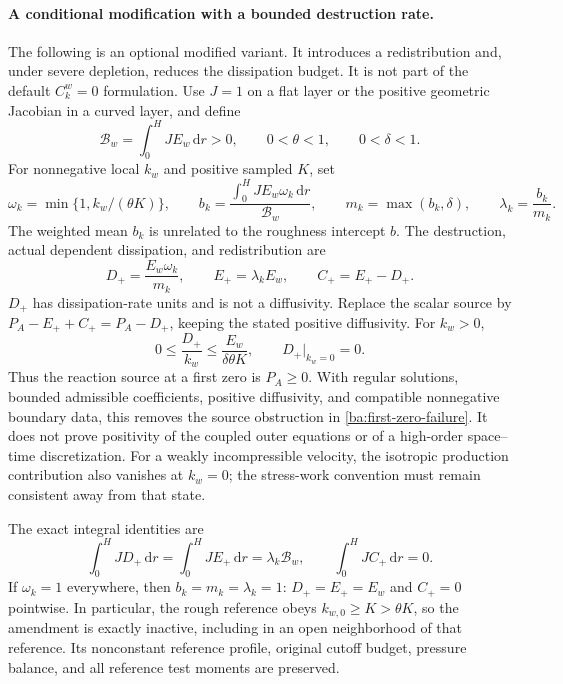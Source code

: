 \documentclass[11pt,a4paper]{article}
\numberwithin{equation}{section}
\begin{document}
\paragraph{A conditional modification with a bounded destruction rate.}
The following is an optional modified variant. It introduces a
redistribution and, under severe depletion, reduces the dissipation
budget. It is not part of the default $C_k^w=0$ formulation.
Use $J=1$ on a flat layer or the positive geometric Jacobian in a curved
layer, and define
\begin{equation}
 \mathcal B_w=\int_0^H J E_w\,\mathrm dr>0,\qquad
 0<\theta<1,\qquad 0<\delta<1.
 \label{ba:positive-budget}
\end{equation}
For nonnegative local $k_w$ and positive sampled $K$, set
\begin{equation}
 \omega_k=\min\{1,k_w/(\theta K)\},\qquad
 b_k=\frac{\int_0^H J E_w\omega_k\,\mathrm dr}{\mathcal B_w},
 \qquad m_k=\max(b_k,\delta),\qquad \lambda_k=\frac{b_k}{m_k}.
 \label{ba:positive-weights}
\end{equation}
The weighted mean $b_k$ is unrelated to the roughness intercept $b$.
The destruction, actual dependent dissipation, and redistribution are
\begin{equation}
 \boxed{D_+=\frac{E_w\omega_k}{m_k},\qquad
 E_+=\lambda_kE_w,\qquad C_+=E_+-D_+.}
 \label{ba:positive-profiles}
\end{equation}
$D_+$ has dissipation-rate units and is not a diffusivity.
Replace the scalar source by
$P_A-E_++C_+=P_A-D_+$, keeping the stated positive diffusivity.
For $k_w>0$,
\begin{equation}
 0\leq\frac{D_+}{k_w}\leq\frac{E_w}{\delta\theta K},
 \qquad D_+|_{k_w=0}=0.
 \label{ba:positive-rate}
\end{equation}
Thus the reaction source at a first zero is $P_A\geq0$.
With regular solutions, bounded admissible coefficients, positive
diffusivity, and compatible nonnegative boundary data, this removes
the source obstruction in \eqref{ba:first-zero-failure}. It does not
prove positivity of the coupled outer equations or of a high-order
space--time discretization. For a weakly incompressible velocity,
the isotropic production contribution also vanishes at $k_w=0$;
the stress-work convention must remain consistent away from that state.

The exact integral identities are
\begin{equation}
 \boxed{\int_0^H JD_+\,\mathrm dr
 =\int_0^H JE_+\,\mathrm dr=\lambda_k\mathcal B_w,\qquad
 \int_0^H JC_+\,\mathrm dr=0.}
 \label{ba:positive-integrals}
\end{equation}
If $\omega_k=1$ everywhere, then $b_k=m_k=\lambda_k=1$:
$D_+=E_+=E_w$ and $C_+=0$ pointwise. In particular, the rough
reference obeys $k_{w,0}\geq K>\theta K$, so the amendment is exactly
inactive, including in an open neighborhood of that reference.
Its nonconstant reference profile, original cutoff budget, pressure
balance, and all reference test moments are preserved.
\end{document}
